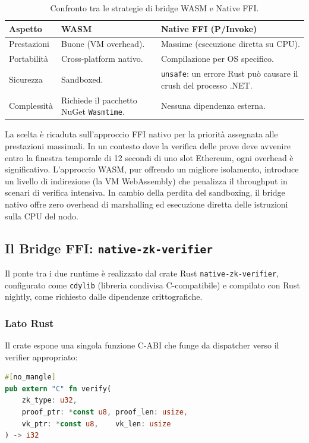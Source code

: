 \documentclass[12pt,a4paper,openright,twoside]{report}
\begin{document}
\begin{table}[H]
\centering
\begin{tabular}{l p{5cm} p{5cm}}
\hline
\textbf{Aspetto} & \textbf{WASM} & \textbf{Native FFI (P/Invoke)} \\
\hline
Prestazioni & Buone (VM overhead). & Massime (esecuzione diretta su CPU). \\
Portabilità & Cross-platform nativo. & Compilazione per OS specifico. \\
Sicurezza & Sandboxed. & \texttt{unsafe}: un errore Rust può causare il crush del processo .NET. \\
Complessità & Richiede il pacchetto NuGet \texttt{Wasmtime}. & Nessuna dipendenza esterna. \\
\hline
\end{tabular}
\caption{Confronto tra le strategie di bridge WASM e Native FFI.}
\label{tab:wasm_vs_ffi}
\end{table}

La scelta è ricaduta sull'approccio FFI nativo per la priorità assegnata alle prestazioni massimali. In un contesto dove la verifica delle prove deve avvenire entro la finestra temporale di 12 secondi di uno slot Ethereum, ogni overhead è significativo. L'approccio WASM, pur offrendo un migliore isolamento, introduce un livello di indirezione (la VM WebAssembly) che penalizza il throughput in scenari di verifica intensiva. In cambio della perdita del sandboxing, il bridge nativo offre zero overhead di marshalling ed esecuzione diretta delle istruzioni sulla CPU del nodo.

\subsection{Il Bridge FFI: \texttt{native-zk-verifier}}\label{sec:ffi_bridge}

Il ponte tra i due runtime è realizzato dal crate Rust \texttt{native-zk-verifier}, configurato come \texttt{cdylib} (libreria condivisa C-compatibile) e compilato con Rust nightly, come richiesto dalle dipendenze crittografiche.

\subsubsection{Lato Rust}

Il crate espone una singola funzione C-ABI che funge da dispatcher verso il verifier appropriato:

\begin{minipage}{\textwidth}
\begin{lstlisting}[language=Rust, caption={Dispatcher FFI in Rust}, style=listingsStyle]
#[no_mangle]
pub extern "C" fn verify(
    zk_type: u32,
    proof_ptr: *const u8, proof_len: usize,
    vk_ptr: *const u8,    vk_len: usize
) -> i32
\end{lstlisting}
\end{minipage}
\\
\end{document}
